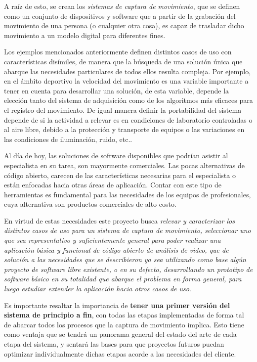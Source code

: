 A raíz de esto, se crean los \emph{sistemas de captura de movimiento}, que se definen como un conjunto de dispositivos y software que a partir de la grabación del movimiento de una persona (o cualquier otra cosa), es capaz de trasladar dicho movimiento a un modelo digital para diferentes fines.

Los ejemplos mencionados anteriormente definen distintos casos de uso con características disímiles, de manera que la búsqueda de una solución única que abarque las necesidades particulares de todos ellos resulta compleja. Por ejemplo, en el ámbito deportivo la velocidad del movimiento es una variable importante a tener en cuenta para desarrollar una solución, de esta variable, depende la elección tanto del sistema de adquisición como de los algoritmos más eficaces para el registro del movimiento.  De igual manera definir la portabilidad del sistema depende de si la actividad a relevar es en condiciones de laboratorio controladas o al aire libre, debido a la protección y transporte de equipos o las variaciones en las condiciones de iluminación, ruido, etc..

Al  día  de  hoy,  las  soluciones  de  software  disponibles que  podrían  asistir al especialista en su tarea, son mayormente comerciales. Las pocas alternativas de código abierto, carecen de las características necesarias para el especialista o están enfocadas hacia otras áreas de aplicación. Contar con este tipo de herramientas es fundamental para las necesidades de los equipos de profesionales, cuya alternativa son productos comerciales de alto costo.

En virtud de estas necesidades este proyecto busca \emph{relevar y caracterizar los distintos casos de uso para un sistema de captura de movimiento,  seleccionar uno que sea representativo y suficientemente general para poder realizar una aplicación básica y funcional de código abierto de análisis de video, que de solución a las necesidades que se describieron ya sea utilizando como base algún  proyecto  de  software  libre  existente,  o en su defecto, desarrollando un prototipo de software básico en su totalidad que abarque el problema en forma general, para luego estudiar extender la aplicación hacia otros casos de uso}.

Es importante resaltar la importancia de \textbf{tener una primer versión del sistema de principio a fin}, con todas las etapas implementadas de forma tal de abarcar todos los procesos que la captura de movimiento implica.  Esto tiene como ventaja que se tendrá un panorama general del estado del arte de cada etapa del sistema, y 
sentará las bases para que proyectos futuros puedan optimizar individualmente dichas etapas acorde a las necesidades del cliente.

